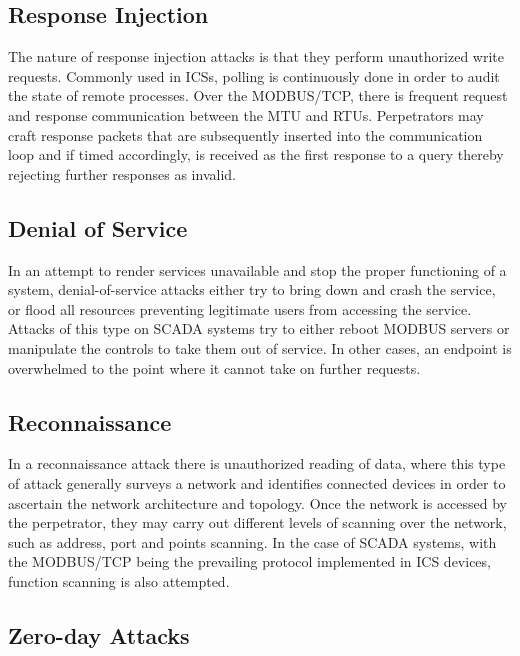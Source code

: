\documentclass[12pt,]{article}
\begin{document}
\subsection{Response Injection}\label{response-injection}

The nature of response injection attacks is that they perform
unauthorized write requests. Commonly used in ICSs, polling is
continuously done in order to audit the state of remote processes. Over
the MODBUS/TCP, there is frequent request and response communication
between the MTU and RTUs. Perpetrators may craft response packets that
are subsequently inserted into the communication loop and if timed
accordingly, is received as the first response to a query thereby
rejecting further responses as invalid.

\subsection{Denial of Service}\label{denial-of-service}

In an attempt to render services unavailable and stop the proper
functioning of a system, denial-of-service attacks either try to bring
down and crash the service, or flood all resources preventing legitimate
users from accessing the service. Attacks of this type on SCADA systems
try to either reboot MODBUS servers or manipulate the controls to take
them out of service. In other cases, an endpoint is overwhelmed to the
point where it cannot take on further requests.

\subsection{Reconnaissance}\label{reconnaissance}

In a reconnaissance attack there is unauthorized reading of data, where
this type of attack generally surveys a network and identifies connected
devices in order to ascertain the network architecture and topology.
Once the network is accessed by the perpetrator, they may carry out
different levels of scanning over the network, such as address, port and
points scanning. In the case of SCADA systems, with the MODBUS/TCP being
the prevailing protocol implemented in ICS devices, function scanning is
also attempted.

\subsection{Zero-day Attacks}\label{zero-day-attacks}
\end{document}
